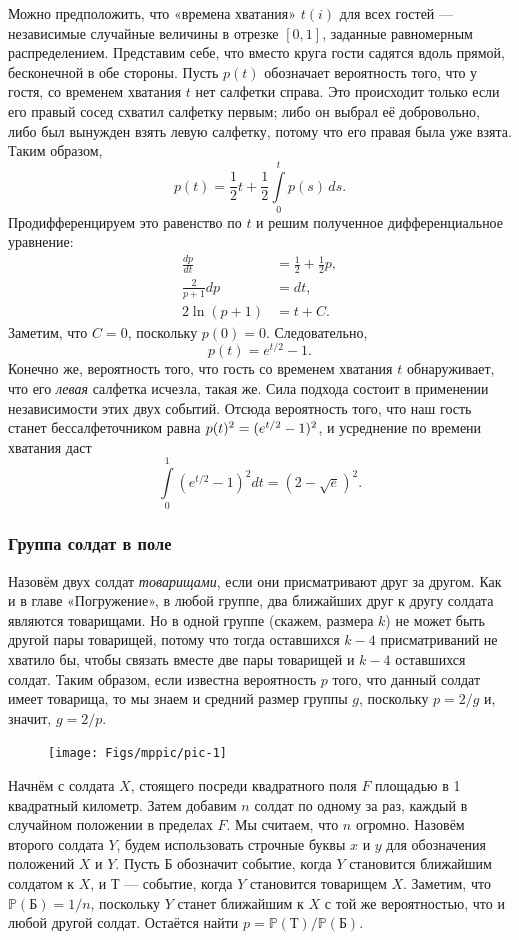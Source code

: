 \medskip

Можно предположить, что «времена хватания» $t(i)$ для всех гостей --- независимые случайные величины в отрезке $[0,1]$, заданные равномерным распределением.
Представим себе, что вместо круга гости садятся вдоль прямой, бесконечной в обе стороны.
Пусть $p(t)$ обозначает вероятность того, что у гостя, со временем хватания $t$ нет салфетки справа.
Это происходит только если его правый сосед схватил салфетку первым;
либо он выбрал её добровольно,
либо был вынужден взять левую салфетку, потому что его правая была уже взята.
Таким образом,
\[p(t)=\frac12t+\frac12\int\limits_0^tp(s)\,ds.\]
Продифференцируем это равенство по $t$ и решим полученное дифференциальное уравнение:
\begin{align*}
\frac{dp}{dt}&=\frac12+\frac12p,
\\
\frac2{p+1}dp&=dt,
\\
2\ln(p+1)&=t+C.
\end{align*}
Заметим, что $C=0$, поскольку $p(0)=0$.
Следовательно,
\[p(t) = e^{t/2} - 1.\]
Конечно же, вероятность того, что гость со временем хватания $t$ обнаруживает, что его \emph{левая} салфетка исчезла, такая же.
Сила подхода состоит в применении независимости этих двух событий.
Отсюда вероятность того, что наш гость станет бессалфеточником равна $p(t)^2 \z= (e^{t/2} -1)^2$, и усреднение по времени хватания даст
\[\int\limits_0^1(e^{t/2}-1)^2dt=(2-\sqrt{e})^2.\]
\heartf

\subsubsection*{Группа солдат в поле}

Назовём двух солдат \emph{товарищами}, если они присматривают друг за другом.
Как и в главе «Погружение», в любой группе, два ближайших друг к другу солдата являются товарищами.
Но в одной группе (скажем, размера $k$) не может быть другой пары товарищей, потому что тогда оставшихся $k-4$ присматриваний не хватило бы, чтобы связать вместе две пары товарищей и $k-4$ оставшихся солдат.
Таким образом, если известна вероятность $p$ того, что данный солдат имеет товарища, то мы знаем и средний размер группы $g$, поскольку $p = 2/g$ и, значит, $g = 2/p$.

\begin{figure}[h!]
\centering
\texttt{[image: Figs/mppic/pic-1]}
\end{figure}

Начнём с солдата $X$, стоящего посреди квадратного поля $F$ площадью в 1 квадратный километр.
Затем добавим $n$ солдат по одному за раз, каждый в случайном положении в пределах $F$. 
Мы считаем, что $n$ огромно.
Назовём второго солдата $Y$, будем использовать строчные буквы $x$ и $y$ для обозначения положений $X$ и $Y$.
Пусть $\text{Б}$ обозначит событие, когда $Y$ становится ближайшим солдатом к $X$, 
и $\text{Т}$ --- событие, когда $Y$ становится товарищем $X$.
Заметим, что $\mathbb{P}(\text{Б})=1/n$, поскольку $Y$ станет ближайшим к $X$ с той же вероятностью, что и любой другой солдат.
Остаётся найти $p=\mathbb{P}(\text{Т})/\mathbb{P}(\text{Б})$.

